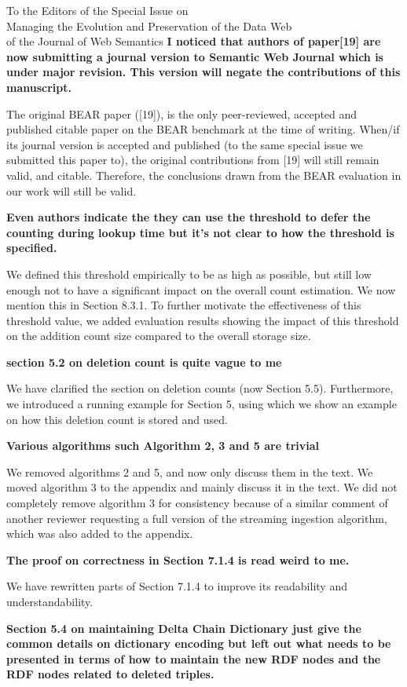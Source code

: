 \documentclass{letter}
\newcounter{section}
\begin{document}
\begin{letter}{To the Editors of the Special Issue on\\Managing the Evolution and Preservation of the Data Web\\of the Journal of Web Semantics}
\textbf{I noticed that authors of paper[19] are now submitting a journal version to Semantic Web Journal which is under major revision. This version will negate the contributions of this manuscript.}

The original BEAR paper ([19]), is the only peer-reviewed, accepted and published citable paper on the BEAR benchmark at the time of writing.
When/if its journal version is accepted and published (to the same special issue we submitted this paper to),
the original contributions from [19] will still remain valid, and citable.
Therefore, the conclusions drawn from the BEAR evaluation in our work will still be valid.

\textbf{Even authors indicate the they can use the threshold to defer the counting during lookup time but it's not clear to how the threshold is specified.}

We defined this threshold empirically to be as high as possible, but still low enough not to have a significant impact on the overall count estimation.
We now mention this in Section 8.3.1.
To further motivate the effectiveness of this threshold value,
we added evaluation results showing the impact of this threshold on the addition count size compared to the overall storage size.

\textbf{section 5.2 on deletion count is quite vague to me }

We have clarified the section on deletion counts (now Section 5.5).
Furthermore, we introduced a running example for Section 5,
using which we show an example on how this deletion count is stored and used.

\textbf{Various algorithms such Algorithm 2, 3 and 5 are trivial}

We removed algorithms 2 and 5, and now only discuss them in the text.
We moved algorithm 3 to the appendix and mainly discuss it in the text.
We did not completely remove algorithm 3 for consistency because of a similar comment
of another reviewer requesting a full version of the streaming ingestion algorithm,
which was also added to the appendix.

\textbf{The proof on correctness in Section 7.1.4 is read weird to me.}

We have rewritten parts of Section 7.1.4 to improve its readability and understandability.

\textbf{Section 5.4 on maintaining Delta Chain Dictionary just give the common details on dictionary encoding but left out what needs to be presented in terms of how to maintain the new RDF nodes and the RDF nodes related to deleted triples.}


\end{letter}
\end{document}
